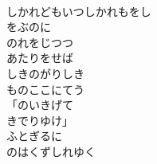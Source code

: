 \documentclass[10pt,b5j]{tarticle} %
\begin{document}
\begin{enumerate}
\begin{minipage}[c]{\blocksize}
        \vspace{\linespace}
        \item~\\
        しかれどもいつしかれもをし\\
        をぶのに\\
        のれをじつつ\\
        あたりをせば\\
        しきのがりしき\\
        ものここにてう\\
        「のいきげて\\
        きでりゆけ」\\
        ふとぎるに\\
        のはくずしれゆく
    
    \end{minipage}
\end{enumerate} %
\end{document}
